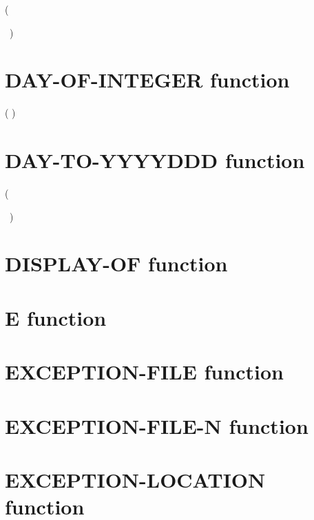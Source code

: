   (
\argument
\begin{0-1}
  \argument
  \begin{0-1}
    \argument
  \end{0-1}
\end{0-1}
\ {})

\section{DAY-OF-INTEGER function}

  ( \argument )

\section{DAY-TO-YYYYDDD function}

  (
\argument
\begin{0-1}
  \argument
  \begin{0-1}
    \argument
  \end{0-1}
\end{0-1}
\ {})

\section{DISPLAY-OF function}


\section{E function}

 

\section{EXCEPTION-FILE function}

 

\section{EXCEPTION-FILE-N function}


\section{EXCEPTION-LOCATION function}

